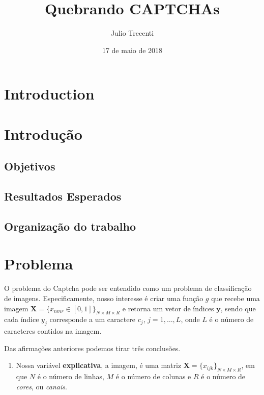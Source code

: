 \documentclass[12pt,]{report}
\title{Quebrando CAPTCHAs}
\author{Julio Trecenti}
\date{17 de maio de 2018}
\providecommand{\tightlist}{%
  \setlength{\itemsep}{0pt}\setlength{\parskip}{0pt}}
\begin{document}
\maketitle

{
\hypersetup{linkcolor=black}
\setcounter{tocdepth}{2}
\tableofcontents
}
\listoftables
\listoffigures
\chapter{Introduction}\label{introduction}

\chapter{Introdução}\label{introducao}

\section{Objetivos}\label{objetivos}

\section{Resultados Esperados}\label{resultados-esperados}

\section{Organização do trabalho}\label{organizacao-do-trabalho}

\chapter{Problema}\label{problema}

O problema do Captcha pode ser entendido como um problema de
classificação de imagens. Especificamente, nosso interesse é criar uma
função \(g\) que recebe uma imagem
\(\mathbf X = \{x_{nmr} \in [0,1]\}_{N\times M \times R}\) e retorna um
vetor de índices \(\mathbf y\), sendo que cada índice \(y_j\)
corresponde a um caractere \(c_j\), \(j = 1, \dots, L\), onde \(L\) é o
número de caracteres contidos na imagem.

Das afirmações anteriores podemos tirar três conclusões.

\begin{enumerate}
\def\labelenumi{\arabic{enumi}.}
\tightlist
\item
  Nossa variável \textbf{explicativa}, a imagem, é uma matriz
  \(\mathbf X = \{x_{ijk}\}_{N\times M \times R}\), em que \(N\) é o
  número de linhas, \(M\) é o número de colunas e \(R\) é o número de
  \emph{cores}, ou \emph{canais}.
\end{enumerate}
\end{document}

